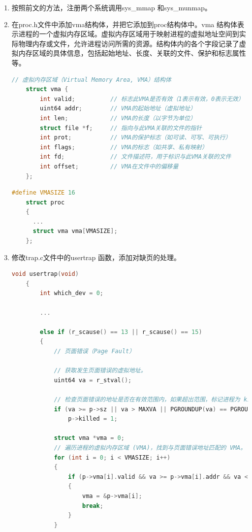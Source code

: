 \begin{enumerate}
    \item 按照前文的方法，注册两个系统调用sys\_mmap 和sys\_munmap。
    \item 在proc.h文件中添加vma结构体，并把它添加到proc结构体中。vma 结构体表示进程的一个虚拟内存区域。虚拟内存区域用于映射进程的虚拟地址空间到实际物理内存或文件，允许进程访问所需的资源。结构体内的各个字段记录了虚拟内存区域的具体信息，包括起始地址、长度、关联的文件、保护和标志属性等。
          \begin{lstlisting}[language=c,title=vma结构体]
    // 虚拟内存区域（Virtual Memory Area, VMA）结构体
    struct vma {
        int valid;          // 标志此VMA是否有效（1表示有效，0表示无效）
        uint64 addr;        // VMA的起始地址（虚拟地址）
        int len;            // VMA的长度（以字节为单位）
        struct file *f;     // 指向与此VMA关联的文件的指针
        int prot;           // VMA的保护标志（如可读、可写、可执行）
        int flags;          // VMA的标志（如共享、私有映射）
        int fd;             // 文件描述符，用于标识与此VMA关联的文件
        int offset;         // VMA在文件中的偏移量
    };                
    \end{lstlisting}
          \begin{lstlisting}[language=c,title=对proc结构体的修改]
    #define VMASIZE 16
    struct proc
    {
      ...
      struct vma vma[VMASIZE];
    };
    \end{lstlisting}
    \item 修改trap.c文件中的usertrap 函数，添加对缺页的处理。
          \begin{lstlisting}[language=c,title=对usertrap函数的修改]
    void usertrap(void)
    {
        int which_dev = 0;
    
        ...

        else if (r_scause() == 13 || r_scause() == 15)
        {
            // 页面错误（Page Fault）
        
            // 获取发生页面错误的虚拟地址。
            uint64 va = r_stval();
        
            // 检查页面错误的地址是否在有效范围内，如果超出范围，标记进程为 killed。
            if (va >= p->sz || va > MAXVA || PGROUNDUP(va) == PGROUNDDOWN(p->trapframe->sp))
                p->killed = 1;
        
            struct vma *vma = 0;
            // 遍历进程的虚拟内存区域 (VMA)，找到与页面错误地址匹配的 VMA。
            for (int i = 0; i < VMASIZE; i++)
            {
                if (p->vma[i].valid && va >= p->vma[i].addr && va < p->vma[i].addr + p->vma[i].len)
                {
                    vma = &p->vma[i];
                    break;
                }
            }
        

\end{lstlisting}
\end{enumerate}
